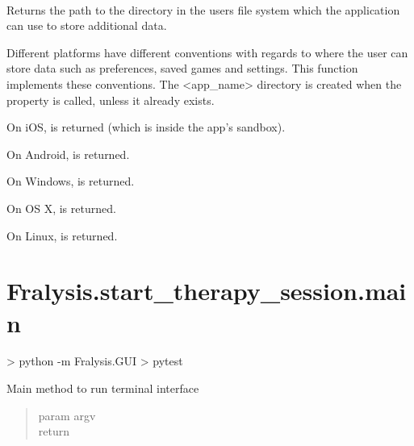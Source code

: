 \documentclass[letterpaper,10pt,english]{sphinxmanual}
\begin{document}
\begin{fulllineitems}
\label{\detokenize{index:Fralysis.GUI.MainApp.user_data_dir}}~

Returns the path to the directory in the users file system which the
application can use to store additional data.

Different platforms have different conventions with regards to where
the user can store data such as preferences, saved games and settings.
This function implements these conventions. The \textless{}app\_name\textgreater{} directory
is created when the property is called, unless it already exists.

On iOS,  is returned (which is inside the
app’s sandbox).

On Android,  is returned.

On Windows,  is returned.

On OS X,  is returned.

On Linux,  is returned.

\end{fulllineitems}



\chapter{Fralysis.start\_therapy\_session.main}
\label{\detokenize{index:module-Fralysis.start_therapy_session.main}}\label{\detokenize{index:fralysis-start-therapy-session-main}}
\textgreater{} python -m Fralysis.GUI
\textgreater{} pytest

Main method to run terminal interface
\begin{quote}\begin{description}
\item[{param argv}] \leavevmode
\item[{return}] \leavevmode
\end{description}\end{quote}
\end{document}

